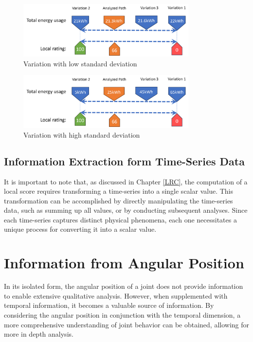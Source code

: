 \begin{figure}[H]
	\centerline{\includegraphics[width=0.8\textwidth]{figures/lowstd.png}}
	\caption{Variation with low standard deviation}
	\label{lowstd}
\end{figure}

\begin{figure}[H]
	\centerline{\includegraphics[width=0.8\textwidth]{figures/highstd.png}}
	\caption{Variation with high standard deviation}
	\label{highstd}
\end{figure}

 
\subsection{Information Extraction form Time-Series Data}\label{extraction}
It is important to note that, as discussed in Chapter \ref{LRC}, the computation of a local score requires transforming a time-series into a single scalar value. This transformation can be accomplished by directly manipulating the time-series data, such as summing up all values, or by conducting subsequent analyses. Since each time-series captures distinct physical phenomena, each one necessitates a unique process for converting it into a scalar value.




\newpage
\section{Information from Angular Position}
In its isolated form, the angular position of a joint does not provide information to enable extensive qualitative analysis. However, when supplemented with temporal information, it becomes a valuable source of information. By considering the angular position in conjunction with the temporal dimension, a more comprehensive understanding of joint behavior can be obtained, allowing for more in depth analysis.



